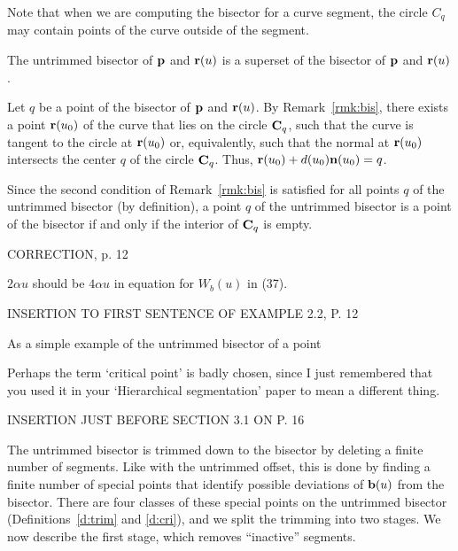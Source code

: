 
Note that when we are computing the bisector for a curve segment,
the circle $C_q$ may contain points of the curve outside of the segment.

\begin{propn}
\label{p:superset}
The untrimmed bisector of ${\bf p}$ and ${\bf r}(u)$
is a superset of the bisector of ${\bf p}$ and ${\bf r}(u)$.
\end{propn}
\prf
Let $q$ be a point of the bisector of ${\bf p}$ and ${\bf r}(u)$.
By Remark~\ref{rmk:bis}, there exists a point ${\bf r}(u_{0})$ of the curve 
that lies on the circle ${\bf C}_q$,
such that the curve is tangent
to the circle at ${\bf r}(u_{0})$ or, equivalently, 
such that the normal at ${\bf r}(u_{0})$ 
intersects the center $q$ of the circle ${\bf C}_q$.
Thus, ${\bf r}(u_{0}) + d(u_{0}) {\bf n}(u_{0}) = q$.
\QED

Since the second condition of Remark~\ref{rmk:bis}
is satisfied for all points $q$ of the untrimmed bisector (by definition),
a point $q$ of the untrimmed bisector
is a point of the bisector if and only if the interior of ${\bf C}_q$ is empty.


\clearpage

CORRECTION, p. 12

$2\alpha u$ should be $4 \alpha u$ in equation for $W_{b}(u)$ in (37).


\clearpage

INSERTION TO FIRST SENTENCE OF EXAMPLE 2.2, P. 12

As a simple example of the untrimmed bisector of a point


\clearpage

Perhaps the term `critical point' is badly chosen, since I just remembered
that you used it in your `Hierarchical segmentation' paper to mean a 
different thing.


\clearpage

INSERTION JUST BEFORE SECTION 3.1 ON P. 16

The untrimmed bisector is trimmed down to the bisector by deleting
a finite number of segments.
Like with the untrimmed offset, this is done by finding
a finite number of special points that identify possible
deviations of ${\bf b}(u)$ from the bisector.
There are four classes of these special points on the untrimmed bisector
(Definitions~\ref{d:trim} and \ref{d:cri}), 
and we split the trimming into two stages.
We now describe the first stage, which removes ``inactive'' segments.

